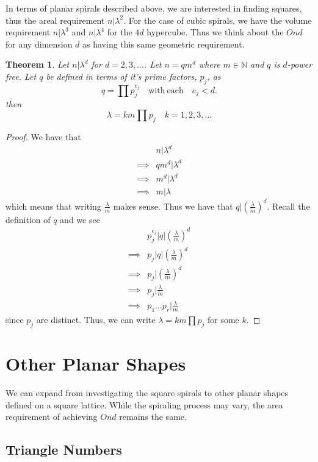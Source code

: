 \documentclass[11pt,reqno]{amsart}
\theoremstyle{mydef}
\newtheorem{thm}{Theorem}[section]
\begin{document}
In terms of planar spirals described above, we are interested
in finding squares, thus the areal requirement $n \vert \lambda^2$. For the case
of cubic spirals, we have the volume requirement $n \vert \lambda^3$ and $n 
\vert \lambda^4$ for the $4d$ hypercube. Thus we think about the $Ond$ for any 
dimension $d$ as having this same geometric requirement.

\begin{thm}
\label{dimdthm}
Let $n\vert \lambda^d$ for $d=2, 3, \ldots$. Let $n = qm^d$ where $m \in \mathbb{N}$ and $q$ is $d$-power 
free. Let $q$ be defined in terms of it's prime factors, $p_j$, as
\[
	q = \prod p_j^{e_j}\quad \text{with}\ \text{each}\quad e_j < d.
\]
then
\[
	\lambda = k m \prod p_j \quad k = 1, 2, 3, \ldots
\]
\end{thm}
\begin{proof}
We have that
\begin{align*}
 & n \vert \lambda^d \\
\implies  & qm^d \vert \lambda^d\\
\implies & m^d \vert \lambda^d\\
\implies & m \vert \lambda 
\end{align*}
which means that writing $\frac{\lambda}{m}$ makes sense. Thus we have 
that $q \vert (\frac{\lambda}{m})^d$. Recall the definition of $q$ and we see
\begin{align*}
& p_j^{e_j} \vert q \vert (\frac{\lambda}{m})^d\\
\implies & p_j \vert q \vert (\frac{\lambda}{m})^d\\
\implies & p_j \vert (\frac{\lambda}{m})^d\\
\implies & p_j \vert \frac{\lambda}{m}\\
\implies & p_1 \ldots p_r \vert \frac{\lambda}{m}
\end{align*}
since $p_j$ are distinct. Thus, we can write $\lambda = k m \prod p_j$ for some $k$.
\end{proof}

\section{Other Planar Shapes}

We can expand from investigating the square spirals to other planar shapes
defined on a square lattice. While the spiraling process may vary, the area
requirement of achieving $Ond$ remains the same.

\subsection{Triangle Numbers}
\end{document}

